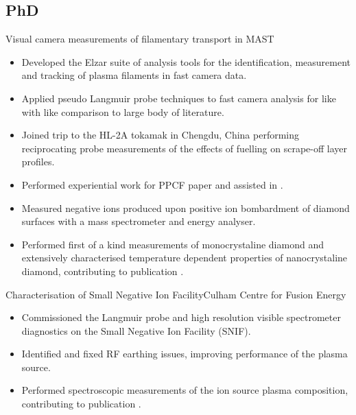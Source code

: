 \documentclass[11pt,a4paper,sans]{moderncv}        %
\begin{document}
\subsection{PhD}
{Visual camera measurements of filamentary transport in MAST}{}{}{}
{\begin{itemize}%
\item Developed the Elzar suite of analysis tools for the identification, measurement and tracking of plasma filaments in fast camera data.
\item Applied pseudo Langmuir probe techniques to fast camera analysis for like with like comparison to large body of literature.
\item Joined trip to the HL-2A tokamak in Chengdu, China performing reciprocating probe measurements of the effects of fuelling on scrape-off layer profiles.
\item Performed experiential work for PPCF paper \cite{Militello2016a} and assisted in \cite{Walkden2016}.
\end{itemize}}

{\begin{itemize}%
\item Measured negative ions produced upon positive ion bombardment of diamond surfaces with a mass spectrometer and energy analyser. 
\item Performed first of a kind measurements of monocrystaline diamond and extensively characterised temperature dependent properties of nanocrystaline diamond, contributing to publication \cite{Cartry2017}.
\end{itemize}}
\newpage
{}
{Characterisation of Small Negative Ion Facility}{\newline Culham Centre for Fusion Energy}
{}
{}{\begin{itemize}%
\item Commissioned the Langmuir probe and high resolution visible spectrometer diagnostics on the Small Negative Ion Facility (SNIF).
\item Identified and fixed RF earthing issues, improving performance of the plasma source.
\item Performed spectroscopic measurements of the ion source plasma composition, contributing to publication \cite{Zacks2017}.
\end{itemize}}
\end{document}
